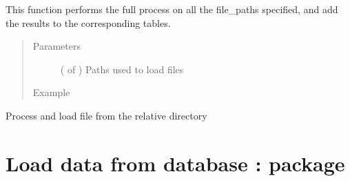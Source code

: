 \documentclass[letterpaper,10pt,english]{sphinxmanual}
\begin{document}
\begin{fulllineitems}
\label{\detokenize{index:loacore.process.file_process.add_files}}
This function performs the full process on all the file\_paths specified, and add the results to the corresponding
tables.
\begin{quote}\begin{description}
\item[{Parameters}] \leavevmode
{} ( of ) \textendash{} Paths used to load files

\item[{Example}] \leavevmode
\end{description}\end{quote}

Process and load file from the relative directory 

%
\begin{sphinxVerbatim}[commandchars=\\\{\}]
  \PYG{p}{[}\PYG{p}{]}
      
       
         

\end{sphinxVerbatim}

\end{fulllineitems}



\chapter{Load data from database :  package}
\label{\detokenize{index:load-data-from-database-load-package}}
\end{document}
